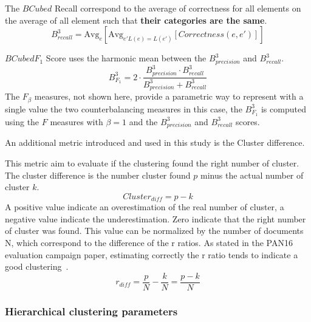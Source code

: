 \begin{definition}
  The $BCubed$ Recall correspond to the average of correctness for all elements on the average of all element such that \textbf{their categories are the same}.
  \begin{equation}
    B^3_{recall} = \text{Avg}_{e}[\text{Avg}_{e' L(e)=L(e')}[Correctness(e, e')]]
  \end{equation}
\end{definition}

\begin{definition}
  $BCubed F_1$ Score uses the harmonic mean between the $B^3_{precision}$ and $B^3_{recall}$.
  \begin{equation}
    B^3_{F_1} =
    2 \cdot \frac{B^3_{precision} \cdot B^3_{recall}}
    {B^3_{precision} + B^3_{recall}}
  \end{equation}
  The $F_\beta$ measures, not shown here, provide a parametric way to represent with a single value the two counterbalancing measures in this case, the $B^3_{F_1}$ is computed using the $F$ measures with $\beta = 1$ and the $B^3_{precision}$ and $B^3_{recall}$ scores.
\end{definition}

An additional metric introduced and used in this study is the Cluster difference.

\begin{definition}
  This metric aim to evaluate if the clustering found the right number of cluster.
  The cluster difference is the number cluster found $p$ minus the actual number of cluster $k$.
  \begin{equation}
    Cluster_{diff} = p - k
  \end{equation}
  A positive value indicate an overestimation of the real number of cluster, a negative value indicate the underestimation.
  Zero indicate that the right number of cluster was found.
  This value can be normalized by the number of documents N, which correspond to the difference of the r ratios.
  As stated in the PAN16 evaluation campaign paper, estimating correctly the r ratio tends to indicate a good clustering~\cite{pan16}.
  \begin{equation}
    r_{diff} = \frac{p}{N} - \frac{k}{N} = \frac{p - k}{N}
  \end{equation}
\end{definition}

\subsubsection{Hierarchical clustering parameters}

